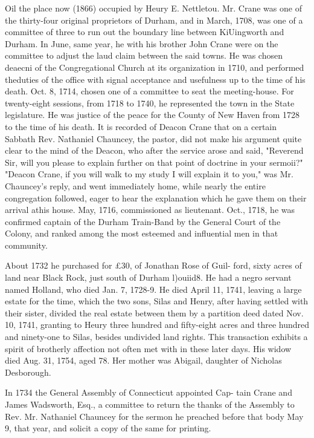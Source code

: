 \documentclass{book}
\begin{document}
Oil the place now (1866) occupied by Heury E. Nettletou. Mr. 
Crane was one of the thirty-four original proprietors of Durham, 
and in March, 1708, was one of a committee of three to run out 
the boundary line between KiUingworth and Durham. In June, 
same year, he with his brother John Crane were on the committee 
to adjust the laud claim between the said towns. He was chosen 
deaecni of the Congregational Church at its organization in 1710, 
and performed theduties of the office with signal acceptance and 
usefulness up to the time of his death. Oct. 8, 1714, chosen one 
of a committee to seat the meeting-house. For twenty-eight 
sessions, from 1718 to 1740, he represented the town in the State 
legislature. He was justice of the peace for the County of New 
Haven from 1728 to the time of his death. It is recorded of 
Deacon Crane that on a certain Sabbath Rev. Nathaniel Chauncey, 
the pastor, did not make his argument quite clear to the mind of 
the Deacon, who after the service arose and said, "Reverend Sir, 
will you please to explain further on that point of doctrine in 
your sermoii?" "Deacon Crane, if you will walk to my study I 
will explain it to you," was Mr. Chauncey's reply, and went 
immediately home, while nearly the entire congregation followed, 
eager to hear the explanation which he gave them on their arrival 
athis house. May, 1716, commissioned as lieutenant. Oct., 
1718, he was confirmed captain of the Durham Train-Band by the 
General Court of the Colony, and ranked among the most esteemed 
and influential men in that community. 

About 1732 he purchased for £30, of Jonathan Rose of Guil- 
ford, sixty acres of land near Black Rock, just south of Durham 
l)ouiid8. He had a negro servant named Holland, who died Jan. 
7, 1728-9. He died April 11, 1741, leaving a large estate for 
the time, which the two sons, Silas and Henry, after having 
settled with their sister, divided the real estate between them by 
a partition deed dated Nov. 10, 1741, granting to Heury three 
hundred and fifty-eight acres and three hundred and ninety-one 
to Silas, besides undivided land rights. This transaction exhibits 
a spirit of brotherly affection not often met with in these later 
days. His widow died Aug. 31, 1754, aged 78. Her mother 
was Abigail, daughter of Nicholas Desborough. 

In 1734 the General Assembly of Connecticut appointed Cap- 
tain Crane and James Wadsworth, Esq., a committee to return 
the thanks of the Assembly to Rev. Mr. Nathaniel Chauncey for 
the sermon he preached before that body May 9, that year, and 
solicit a copy of the same for printing. 
\end{document}
